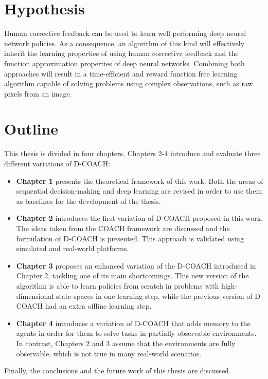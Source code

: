 \begin{intro}
\section{Hypothesis}
Human corrective feedback can be used to learn well performing deep neural network policies. As a consequence, an algorithm of this kind will effectively inherit the learning properties of using human corrective feedback and the function approximation properties of deep neural networks. Combining both approaches will result in a time-efficient and reward function free learning algorithm capable of solving problems using complex observations, such as raw pixels from an image.

\section{Outline}
This thesis is divided in four chapters. Chapters 2-4 introduce and evaluate three different variations of D-COACH:

\begin{itemize}
    \item \textbf{Chapter 1} presents the theoretical framework of this work. Both the areas of sequential decision-making and deep learning are revised in order to use them as baselines for the development of the thesis.
    \item \textbf{Chapter 2} introduces the first variation of D-COACH proposed in this work. The ideas taken from the COACH framework are discussed and the formulation of D-COACH is presented. This approach is validated using simulated and real-world platforms.
    \item \textbf{Chapter 3} proposes an enhanced variation of the D-COACH introduced in Chapter 2, tackling one of its main shortcomings. This new version of the algorithm is able to learn policies from scratch in problems with high-dimensional state spaces in one learning step, while the previous version of D-COACH had an extra offline learning step.
    \item \textbf{Chapter 4} introduces a variation of D-COACH that adds memory to the agents in order for them to solve tasks in partially observable environments. In contrast, Chapters 2 and 3 assume that the environments are fully observable, which is not true in many real-world scenarios.
\end{itemize}

Finally, the conclusions and the future work of this thesis are discussed. 

\end{intro}